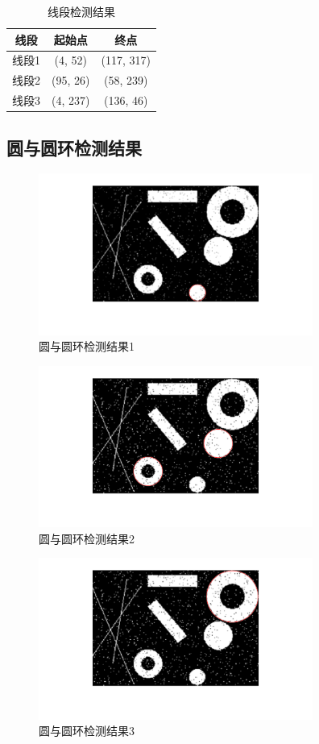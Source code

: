 \documentclass[conference]{IEEEtran}
\begin{document}
\begin{table}[htbp]
	\caption{线段检测结果}
	\label{table1} 
	\centering  
	\begin{tabular}{|c|c|c|}
	\hline
	线段 & 起始点 & 终点 \\
	\hline
	线段1 & (4, 52) & (117, 317) \\
	\hline
	线段2 & (95, 26) & (58, 239) \\
	\hline
	线段3 & (4, 237) & (136, 46) \\
	\hline
	\end{tabular}
\end{table}

\subsection{圆与圆环检测结果}
\begin{figure}[htbp]
	\centerline{
		\includegraphics[width=9cm]{circle1.png} 	
	}
	\caption{圆与圆环检测结果1}
	\label{pic3}
\end{figure}
\begin{figure}[htbp]
	\centerline{
		\includegraphics[width=9cm]{circle23.png} 	
	}
	\caption{圆与圆环检测结果2}
	\label{pic4}
\end{figure}
\begin{figure}[htbp]
	\centerline{
		\includegraphics[width=9cm]{circle4.png} 	
	}
	\caption{圆与圆环检测结果3}
	\label{pic5}
\end{figure}
\end{document}
